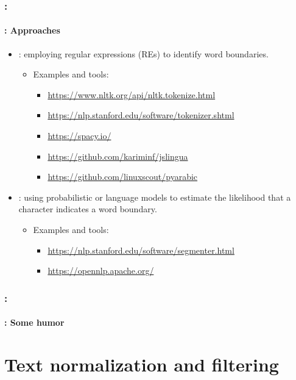 \documentclass[xcolor=table]{beamer}
\begin{document}
\begin{frame}
	\frametitle{\insertshortsubtitle: \insertsection}
	\framesubtitle{\insertsubsection: Approaches}
	
	\begin{itemize}
		\item {}: employing regular expressions (REs) to identify word boundaries.
		\begin{itemize}
			\item Examples and tools:
			\begin{itemize}
				\item \url{https://www.nltk.org/api/nltk.tokenize.html}
				\item \url{https://nlp.stanford.edu/software/tokenizer.shtml}
				\item \url{https://spacy.io/}
				\item \url{https://github.com/kariminf/jslingua}
				\item \url{https://github.com/linuxscout/pyarabic}
			\end{itemize}
		\end{itemize}
		\item {}: using probabilistic or language models to estimate the likelihood that a character indicates a word boundary.
		\begin{itemize}
			\item Examples and tools:
			\begin{itemize}
				\item \url{https://nlp.stanford.edu/software/segmenter.html}
				\item \url{https://opennlp.apache.org/}
			\end{itemize}
		\end{itemize}
	\end{itemize}

\end{frame}

\begin{frame}
	\frametitle{\insertshortsubtitle: \insertsection}
	\framesubtitle{\insertsubsection: Some humor}

	\begin{center}
	\end{center}

\end{frame}


\section{Text normalization and filtering}
\end{document}
